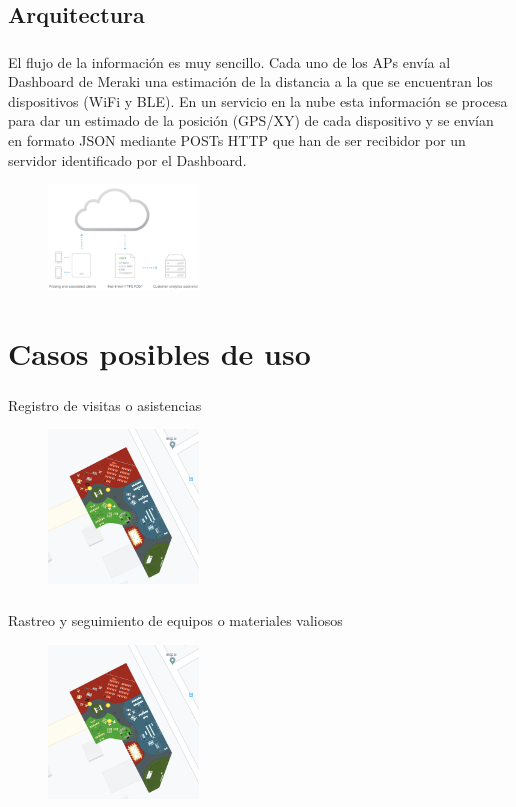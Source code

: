 \documentclass{beamer}
\begin{document}
\subsection{\hspace{1in}Arquitectura}
\begin{frame}
\frametitle{\currentname}
El flujo de la información es muy sencillo. Cada uno de los APs envía al Dashboard de Meraki una estimación de la distancia a la que se encuentran los dispositivos (WiFi y BLE). En un servicio en la nube esta información se procesa para dar un estimado de la posición (GPS/XY) de cada dispositivo y se envían en formato JSON mediante POSTs HTTP que han de ser recibidor por un servidor identificado por el Dashboard.
\begin{figure}[H]
\includegraphics[width=4cm]{img/merakiarq.png}
\end{figure}
\end{frame}

\section{\hspace{1in}Casos posibles de uso}
\begin{frame}
\frametitle{\currentname}
Registro de visitas o asistencias
\begin{figure}[H]
\includegraphics[width=4cm]{img/posiciones.png}
\end{figure}
\end{frame}

\begin{frame}
\frametitle{\currentname}
Rastreo y seguimiento de equipos o materiales valiosos
\begin{figure}[H]
\includegraphics[width=4cm]{img/posiciones.png}
\end{figure}
\end{frame}
\end{document}
